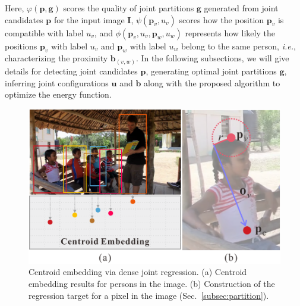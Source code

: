 \documentclass[10pt,twocolumn,letterpaper]{article}
\begin{document}
Here, $\varphi(\mathbf{p},\mathbf{g})$ scores the quality of joint partitions  $\mathbf{g}$ generated from joint candidates $\mathbf{p}$ for the input image $ \mathbf{I} $, $\psi(\mathbf{p}_v, u_v)$
scores how the position $\mathbf{p}_v$ is compatible with label $u_v$, and $\phi(\mathbf{p}_v, u_v, \mathbf{p}_w, u_w)$ represents how likely the positions $\mathbf{p}_v$ with label $u_v$ and $\mathbf{p}_w$ with label $u_w$ belong to the same person, \emph{i.e.}, characterizing the proximity $\mathbf{b}_{(v,w)}$.
In the following subsections, we will give  details for detecting joint candidates $ \mathbf{p} $, generating optimal joint partitions $ \mathbf{g} $, inferring joint configurations $ \mathbf{u} $ and $ \mathbf{b} $ along with the proposed algorithm to optimize the energy function.

\begin{figure}[t!]
\begin{center}
\includegraphics[scale=0.5]{figs/hough_space_example.pdf}
\caption{Centroid embedding via dense joint regression. (a)  Centroid embedding results for persons in the image. (b) Construction of the regression target for a pixel in the image (Sec.~\ref{subsec:partition}).}
\label{fig:center_embedding_example}
\end{center}
\vspace{-20pt}
\end{figure}
\end{document}
